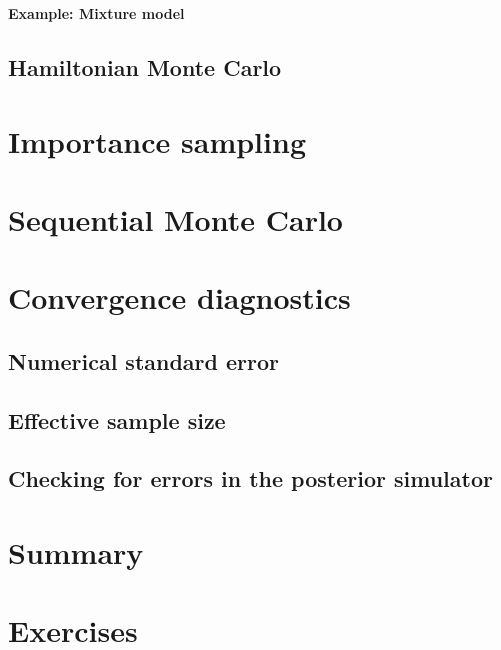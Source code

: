 \textbf{Example: Mixture model}

      

\subsection{Hamiltonian Monte Carlo}\label{sec523}

\section{Importance sampling}\label{sec52}

\section{Sequential Monte Carlo}\label{sec53}

\section{Convergence diagnostics}\label{sec54}
\subsection{Numerical standard error}
\subsection{Effective sample size}
\subsection{Checking for errors in the posterior simulator}
\cite{geweke2004getting}

\section{Summary}\label{sec55}


\section{Exercises}\label{sec56}

